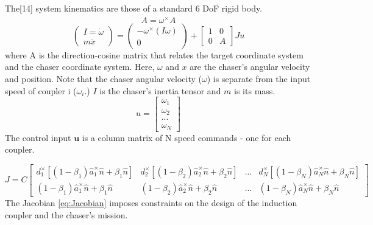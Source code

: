 \documentclass{article}
\begin{document}
The[14] system kinematics are those of a standard 6 DoF rigid body. 
\begin{equation}\label{eq:rotMrxPropigation}
\dot{A} = \omega^{\times}A
\end{equation}
\begin{equation}\label{eq:RigidBodyKinematics}
\begin{pmatrix} 
I =\dot{\omega} \\
m\ddot{x}
 \end{pmatrix}
=
\begin{pmatrix} 
-\omega^{ \times} \left( I\omega \right) \\
0
\end{pmatrix}
+
\begin{bmatrix}
1 & 0 \\
0 & A
\end{bmatrix}
Ju
\end{equation}
where A is the direction-cosine matrix that relates the target coordinate system and the chaser coordinate system. Here, $\omega$ and $x$ are the chaser's angular velocity and position. Note that the chaser angular velocity ($\omega$) is separate from the input speed of coupler i ($\omega_i$.)  $I$ is the chaser's inertia tensor and $m$ is its mass.
\begin{equation}
\label{eq:u_definition}
u = 
\begin{bmatrix}
\omega_1\\
\omega_2\\
...\\
\omega_N
\end{bmatrix}
\end{equation}
The control input $\boldsymbol{u}$ is a column matrix of N speed commands - one for each coupler.

\begin{equation}\label{eq:Jacobian}
J = C\begin{bmatrix} 
d_1^{\times}\left[ \left(1-\beta_1 \right )\hat{a}_1^{\times}\hat{n} + \beta_1\hat{n}\right ]&
d_2^{\times}\left[\left(1-\beta_2 \right )\hat{a}_2^{\times}\hat{n} + \beta_2\hat{n}\right ] &
 ... &
d_N^{\times} \left[\left(1-\beta_N \right )\hat{a}_N^{\times}\hat{n} + \beta_N\hat{n}\right ]
\\

\left(1-\beta_1 \right )\hat{a}_1^{\times}\hat{n} + \beta_1\hat{n}&
\left(1-\beta_2 \right )\hat{a}_2^{\times}\hat{n} + \beta_2\hat{n} &
 ... &
 \left(1-\beta_N \right )\hat{a}_N^{\times}\hat{n} + \beta_N\hat{n}
\end{bmatrix}
\end{equation}
The Jacobian \ref{eq:Jacobian}  imposes constraints on the design of the induction coupler and the chaser's mission.
\end{document}
